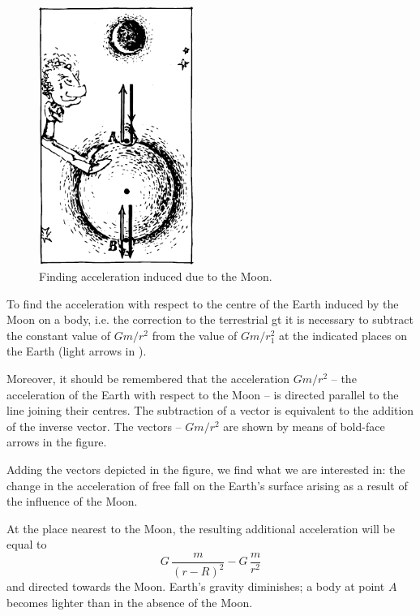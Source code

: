 \begin{figure}[!ht]
\centering
\includegraphics[width=0.45\textwidth]{figures/fig-6-11.pdf}
\caption{Finding acceleration induced due to the Moon.}
\label{fig-6-11}
\end{figure}

To find the acceleration with respect to the centre of
the Earth induced by the Moon on a body, i.e. the correction to the terrestrial gt it is necessary to subtract the
constant value of $Gm/r^{2}$ from the value of $Gm/r_{1}^{2}$ at the indicated places on the Earth (light arrows in ).

Moreover, it should be remembered that the acceleration
$Gm/r^{2}$ -- the acceleration of the Earth with respect to the
Moon -- is directed parallel to the line joining their
centres. The subtraction of a vector is equivalent to the
addition of the inverse vector. The vectors -- $Gm/r^{2}$ are
shown by means of bold-face arrows in the figure.

Adding the vectors depicted in the figure, we find what
we are interested in: the change in the acceleration of
free fall on the Earth's surface arising as a result of the
influence of the Moon.

At the place nearest to the Moon, the resulting additional acceleration will be equal to
 \begin{equation*}%
 G  \, \dfrac{m}{(r - R)^{2}} - G \, \dfrac{m}{r^{2}} 
 \end{equation*}
and directed towards the Moon. Earth's gravity diminishes; a body at point $A$ becomes lighter than in the
absence of the Moon.

